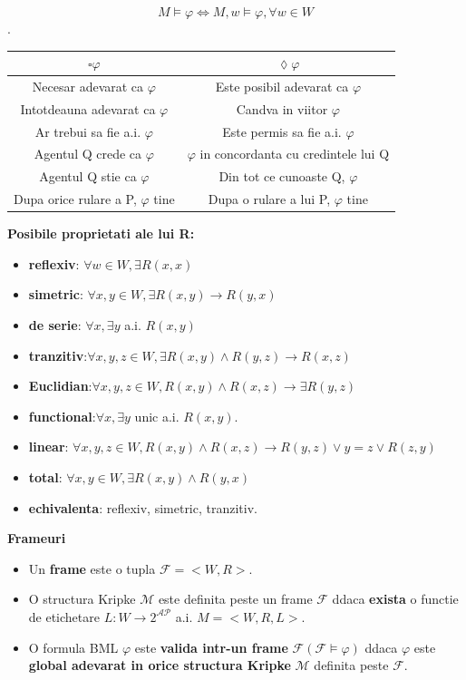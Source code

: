 \documentclass[10pt,a4paper,twocolumn]{report}
\begin{document}
\[M \models \varphi \Leftrightarrow M,w \models \varphi, \forall w \in W\].
\begin{tabular}{|c|c|}
\hline 
$\square \varphi$ & $\lozenge \varphi$ \\ 
\hline 

Necesar adevarat ca $\varphi$ & Este posibil adevarat ca $\varphi$ \\ 

Intotdeauna adevarat ca $\varphi$ & Candva in viitor $\varphi$ \\ 

Ar trebui sa fie a.i. $\varphi$ & Este permis sa fie a.i. $\varphi$ \\ 

Agentul Q crede ca $\varphi$ & $\varphi$ in concordanta cu credintele lui Q \\ 

Agentul Q stie ca $\varphi$ & Din tot ce cunoaste Q, $\varphi$ \\ 
 
Dupa orice rulare a P, $\varphi$ tine & Dupa o rulare a lui P, $\varphi$ tine \\ 
\hline 
\end{tabular}
\hfill
\break
\textbf{Posibile proprietati ale lui R:}
\begin{itemize}

\item \textbf{reflexiv}: $\forall w \in W, \exists R(x,x)$
\item \textbf{simetric}: $\forall x,y \in W, \exists R(x,y) \rightarrow R(y,x)$
\item \textbf{de serie}: $\forall x, \exists y$ a.i. $R(x,y)$
\item \textbf{tranzitiv}:$\forall x,y,z \in W, \exists R(x,y) \wedge R(y,z) \rightarrow R(x,z)$
\item \textbf{Euclidian}:$\forall x,y,z \in W, R(x,y) \wedge R(x,z) \rightarrow \exists R(y,z)$
\item \textbf{functional}:$\forall x, \exists y$ unic a.i. $R(x,y)$.
\item \textbf{linear}: $\forall x,y,z \in W, R(x,y) \wedge R(x,z) \rightarrow R(y,z) \vee y = z \vee R(z,y)$
\item \textbf{total}: $\forall x,y \in W, \exists R(x,y) \wedge R(y,x)$
\item \textbf{echivalenta}: reflexiv, simetric, tranzitiv.

\end{itemize}
\textbf{Frameuri}
\begin{itemize}
\item Un \textbf{frame} este o tupla $\mathcal{F} = <W, R>$.
\item O structura Kripke $\mathcal{M}$ este definita peste un frame $\mathcal{F}$ ddaca \textbf{exista} o functie de etichetare $L:W \rightarrow 2^\mathcal{AP}
$ a.i. $M=<W,R,L>$.
\item O formula BML $\varphi$ este \textbf{valida intr-un frame} $\mathcal{F} (\mathcal{F} \models \varphi)$ ddaca $\varphi$ este \textbf{global adevarat in orice structura Kripke} $\mathcal{M}$ definita peste $\mathcal{F}$.
\end{itemize}
\end{document}

